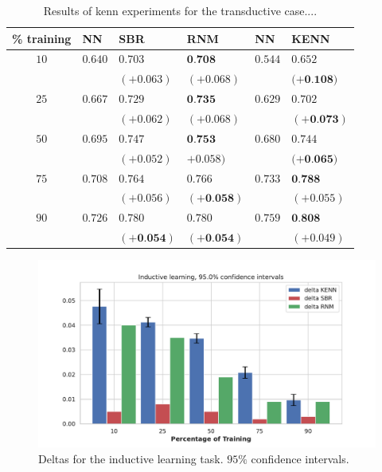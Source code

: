 \begin{table}[h]
	\caption{Results of kenn experiments for the transductive case....}
	\label{tab:resultstransductive}
	\centering
\begin{tabular}{c|lll|ll} 
	\% training & NN & SBR & RNM & NN & KENN \\
	\hline 
	\rule{0pt}{3ex} $10$ & $0.640$ & $0.703$ & $\mathbf{0 . 7 0 8}$ & $0.544$ & $0.652$ \\
	& & $(+0.063)$ & $(+0.068)$ & & $(+\mathbf{0 . 1 0 8 )}$ \\
	$25$ & $0.667$ & $0.729$ & $\mathbf{0 . 7 3 5}$ & $0.629$ & $0.702$ \\
	& & $(+0.062)$ & $(+0.068)$ & & $(+\mathbf{0 . 0 7 3})$ \\
	$50$ & $0.695$ & $0.747$ & $\mathbf{0 . 7 5 3}$ & $0.680$ & $0.744$ \\
	& & $(+0.052)$ & $+0.058)$ & & $(+\mathbf{0 . 0 6 5 )}$ \\
	$75$ & $0.708$ & $0.764$ & $0.766$ & $0.733$ & $\mathbf{0 . 7 8 8}$ \\
	& & $(+0.056)$ & $(+\mathbf{0 . 0 5 8})$ & & $(+0.055)$ \\
	$90$ & $0.726$ & $0.780$ & $0.780$ & $0.759$ & $\mathbf{0 . 8 0 8}$ \\
	& & $\mathbf{( + 0 . 0 5 4 )}$ & $\mathbf{( + 0 . 0 5 4 )}$ & & $(+0.049)$ \\
	\hline \hline
\end{tabular}
\end{table}

\begin{figure}
	\centering
	\includegraphics[width=0.9\linewidth]{figures/deltas_inductive.pdf} 
		\caption{Deltas for the inductive learning task. $95\%$ confidence intervals.}
\end{figure}

